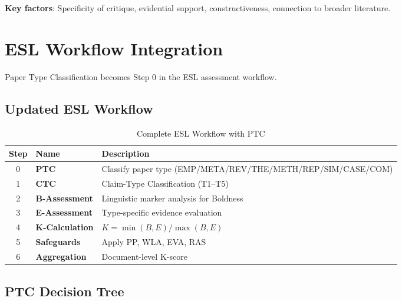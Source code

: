 \documentclass[11pt,a4paper]{article}
\begin{document}
\textbf{Key factors}: Specificity of critique, evidential support, constructiveness, connection to broader literature.


\section{ESL Workflow Integration}
\label{sec:workflow}

Paper Type Classification becomes Step 0 in the ESL assessment workflow.

\subsection{Updated ESL Workflow}

\begin{table}[h]
\centering
\caption{Complete ESL Workflow with PTC}
\label{tab:workflow}
\begin{tabular}{clp{7cm}}
\toprule
\textbf{Step} & \textbf{Name} & \textbf{Description} \\
\midrule
0 & \textbf{PTC} & Classify paper type (EMP/META/REV/THE/METH/REP/SIM/CASE/COM) \\
1 & \textbf{CTC} & Claim-Type Classification (T1--T5) \\
2 & \textbf{B-Assessment} & Linguistic marker analysis for Boldness \\
3 & \textbf{E-Assessment} & Type-specific evidence evaluation \\
4 & \textbf{K-Calculation} & $K = \min(B,E)/\max(B,E)$ \\
5 & \textbf{Safeguards} & Apply PP, WLA, EVA, RAS \\
6 & \textbf{Aggregation} & Document-level K-score \\
\bottomrule
\end{tabular}
\end{table}

\subsection{PTC Decision Tree}
\end{document}
